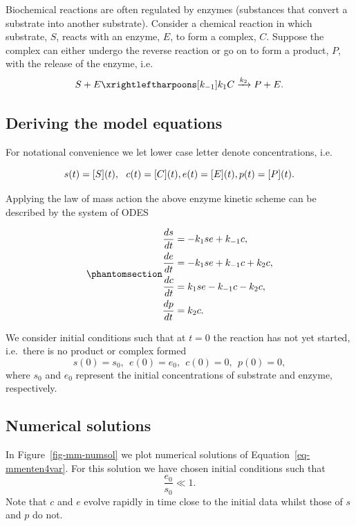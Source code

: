 \documentclass[
  letterpaper,
  DIV=11,
  numbers=noendperiod]{scrreprt}
\begin{document}
Biochemical reactions are often regulated by enzymes (substances that
convert a substrate into another substrate). Consider a chemical
reaction in which substrate, \(S\), reacts with an enzyme, \(E\), to
form a complex, \(C\). Suppose the complex can either undergo the
reverse reaction or go on to form a product, \(P\), with the release of
the enzyme, i.e. \[
S+E  \xrightleftharpoons[k_{-1}]{k_{1}}  C \xrightarrow{k_2} P+E .
\]

\subsection{Deriving the model
equations}\label{deriving-the-model-equations}

For notational convenience we let lower case letter denote
concentrations, i.e.~

\[
s(t)=[S](t),  \ \ c(t)=[C](t) , \\ e(t)=[E](t), \\ p(t)=[P](t).
\]

Applying the law of mass action the above enzyme kinetic scheme can be
described by the system of ODES

\begin{equation}\protect\phantomsection\label{eq-mmenten4var}{
\begin{aligned}
\frac{d s}{dt} &= -k_1 se + k_{-1}c, \nonumber \\
\frac{d e}{dt} &= -k_1 se + k_{-1}c +k_2 c,  \nonumber\\
\frac{d c}{dt} &= k_1 se - k_{-1}c-k_2c, \nonumber \\
\frac{d p}{dt} &= k_2 c.
\end{aligned}
}\end{equation}

We consider initial conditions such that at \(t=0\) the reaction has not
yet started, i.e.~there is no product or complex formed \[
s(0)=s_0, \ \ e(0)=e_0, \ \ c(0)=0, \ \ p(0)=0,
\] where \(s_0\) and \(e_0\) represent the initial concentrations of
substrate and enzyme, respectively.

\subsection{Numerical solutions}\label{numerical-solutions-3}

In Figure~\ref{fig-mm-numsol} we plot numerical solutions of
Equation~\ref{eq-mmenten4var}. For this solution we have chosen initial
conditions such that \[
\frac{e_0}{s_0}\ll 1.
\] Note that \(c\) and \(e\) evolve rapidly in time close to the initial
data whilst those of \(s\) and \(p\) do not.
\end{document}
